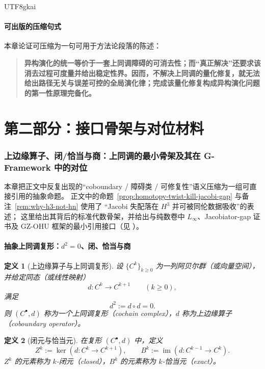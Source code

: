 \documentclass[12pt]{article}
\newtheorem{definition}{定义}[section]
\begin{document}
\begin{CJK*}{UTF8}{gkai}
\subsection{可出版的压缩句式}

本章论证可压缩为一句可用于方法论段落的陈述：
\begin{quote}
\textbf{异构演化的统一等价于一套上同调障碍的可消去性；而“真正解决”还要求该消去过程可度量并给出稳定性界。因而，不解决上同调的量化修复，就无法给出路径无关与误差可控的全局演化律；完成该量化修复构成异构演化问题的第一性原理完备化。}
\end{quote}
\clearpage

\setcounter{part}{2}
\part*{第二部分：接口骨架与对位材料}

\setcounter{section}{0}
\section{上边缘算子、闭/恰当与商：上同调的最小骨架及其在 G-Framework 中的对位}\label{app:A-cohomology-skeleton}

本章把正文中反复出现的“coboundary / 障碍类 / 可修复性”语义压缩为一组可直接引用的抽象命题。
正文中的命题~\ref{prop:homotopy-twist-kill-jacobi-gap} 与备注~\ref{rem:why-h3-not-hn} 使用了
“Jacobi 失配落在 $H^3$ 并可被同伦数据吸收”的表述；
这里给出其背后的标准代数骨架，并给出与纯数卷中 $L_\infty$、Jacobiator-gap 证书及 GZ-OHU 框架的最小引用接口（见 \cite{GaoZheng2025GFramework}）。

\subsection{抽象上同调复形：$d^2=0$、闭、恰当与商}

\begin{definition}[上边缘算子与上同调复形]\label{def:A-cochain-complex}
设 $\{C^k\}_{k\ge0}$ 为一列阿贝尔群（或向量空间），
并给定同态（或线性映射）
\[
  d:C^k\longrightarrow C^{k+1}\qquad (k\ge0),
\]
满足
\[
  d^2:=d\circ d = 0.
\]
则 $(C^\bullet,d)$ 称为一个上同调复形（cochain complex），$d$ 称为上边缘算子（coboundary operator）。
\end{definition}

\begin{definition}[闭元与恰当元]\label{def:A-closed-exact}
在复形 $(C^\bullet,d)$ 中，定义
\[
  Z^k := \ker(d:C^k\to C^{k+1}),\qquad
  B^k := \operatorname{im}(d:C^{k-1}\to C^k).
\]
$Z^k$ 的元素称为 $k$-闭元（closed），$B^k$ 的元素称为 $k$-恰当元（exact）。
\end{definition}


\end{CJK*}
\end{document}
